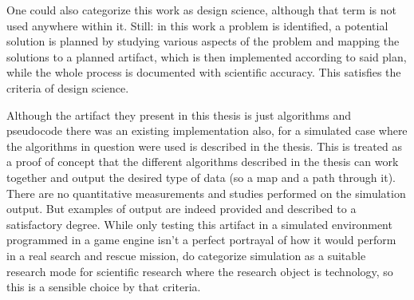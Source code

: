 \documentclass{article}
\begin{document}

	\par One could also categorize this work as design science, although 
that term is not used anywhere within it. Still: in this work a problem is 
identified, a potential solution is planned by studying various aspects of the 
problem and mapping the solutions to a planned artifact, which is then 
implemented according to said plan, while the whole process is documented with 
scientific accuracy. This satisfies the criteria of design 
science.\parencite{V5}


	\par Although the artifact they present in this thesis is just 
algorithms and pseudocode there was an existing implementation also, for a 
simulated case where the algorithms in question were used is described in the 
thesis.\parencite{T2} This is treated as a proof of concept that the different 
algorithms described in the thesis can work together and output the desired 
type of data (so a map and a path through it). There are no quantitative 
measurements and studies performed on the simulation output. But examples of 
output are indeed provided and described to a satisfactory degree. While only 
testing this artifact in a simulated environment programmed in a game engine 
isn't a perfect portrayal of how it would perform in a real search and rescue 
mission, \textcite{E2} do categorize simulation as a suitable research mode for 
scientific research where the research object is technology, so this is a 
sensible choice by that criteria.

\end{document}
